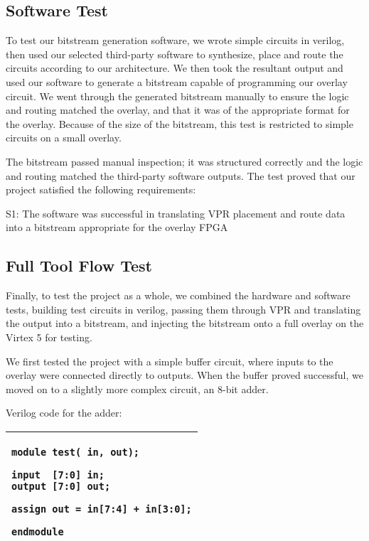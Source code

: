 \subsection{Software Test}

To test our bitstream generation software, we wrote simple circuits in verilog, then used our selected third-party software to synthesize, place and route the circuits according to our architecture.
We then took the resultant output and used our software to generate a bitstream capable of programming our overlay circuit.
We went through the generated bitstream manually to ensure the logic and routing matched the overlay, and that it was of the appropriate format for the overlay.
Because of the size of the bitstream, this test is restricted to simple circuits on a small overlay.

The bitstream passed manual inspection; it was structured correctly and the logic and routing matched the third-party software outputs.
The test proved that our project satisfied the following requirements:
\begin{itemlist}
	\item S1: The software was successful in translating VPR placement and route data into a bitstream appropriate for the overlay FPGA
\end{itemlist}

\subsection{Full Tool Flow Test}

Finally, to test the project as a whole, we combined the hardware and software tests, building test circuits in verilog, passing them through VPR and translating the output into a bitstream, and injecting the bitstream onto a full overlay on the Virtex 5 for testing.

We first tested the project with a simple buffer circuit, where inputs to the overlay were connected directly to outputs.
When the buffer proved successful, we moved on to a slightly more complex circuit, an 8-bit adder.

Verilog code for the adder:

\begin{tabular}{|p{7cm}|}
\hline
\begin{verbatim}
module test( in, out);

input  [7:0] in;
output [7:0] out;

assign out = in[7:4] + in[3:0];

endmodule
\end{verbatim}
\\ \hline
\end{tabular}




